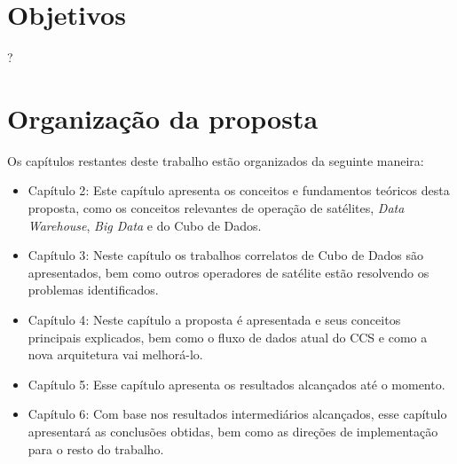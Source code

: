\section{Objetivos}

{\color{red} ?}

\section{Organização da proposta}

Os capítulos restantes deste trabalho estão organizados da seguinte maneira:

\begin{itemize}
	\item{Capítulo 2}: Este capítulo apresenta os conceitos e fundamentos teóricos desta proposta, como os conceitos relevantes de operação de satélites, \textit{Data Warehouse}, \textit{Big Data} e do Cubo de Dados.
	\item{Capítulo 3}: Neste capítulo os trabalhos correlatos de Cubo de Dados são apresentados, bem como outros operadores de satélite estão resolvendo os problemas identificados.
	\item{Capítulo 4}: {\color{red} Neste capítulo a proposta é apresentada e seus conceitos principais explicados, bem como o fluxo de dados atual do CCS e como a nova arquitetura vai melhorá-lo.}
	\item{Capítulo 5}: Esse capítulo apresenta os resultados alcançados até o momento.
	\item{Capítulo 6}: Com base nos resultados intermediários alcançados, esse capítulo apresentará as conclusões obtidas, bem como as direções de implementação para o resto do trabalho.
\end{itemize}

